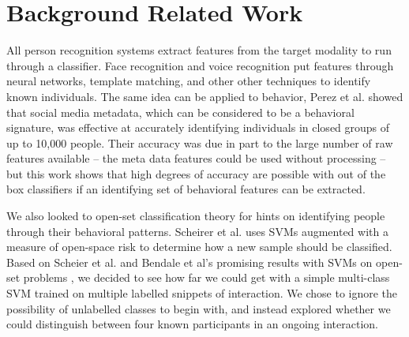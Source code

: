 \documentclass[conference]{IEEEtran}
\begin{document}





\section{Background Related Work}

All person recognition systems extract features from the target modality to run through a classifier. Face recognition \cite{tolba2006face} and voice recognition \cite{beigi2011speaker} put features through neural networks, template matching, and other other techniques to identify known individuals. The same idea can be applied to behavior, Perez et al. showed that social media metadata, which can be considered to be a behavioral signature, was effective at accurately identifying individuals in closed groups of up to 10,000 people. Their accuracy was due in part to the large number of raw features available -- the meta data features could be used without processing -- but this work shows that high degrees of accuracy are possible with out of the box classifiers if an identifying set of behavioral features can be extracted. 

We also looked to open-set classification theory for hints on identifying people through their behavioral patterns. Scheirer et al. uses SVMs augmented with a measure of open-space risk to determine how a new sample should be classified\cite{scheirer_toward_2013}. Based on Scheier et al. and Bendale et al's promising results with SVMs on open-set problems \cite{bendale_towards_2015}\cite{scheirer_toward_2013}, we decided to see how far we could get with a simple multi-class SVM trained on multiple labelled snippets of interaction. We chose to ignore the possibility of unlabelled classes to begin with, and instead explored whether we could distinguish between four known participants in an ongoing interaction. 
\end{document}
